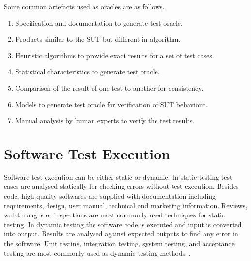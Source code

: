 Some common artefacts used as oracles are as follows.
\begin{enumerate}
\item Specification and documentation to generate test oracle. 
\item Products similar to the SUT but different in algorithm. %
\item Heuristic algorithms to provide exact results for a set of test cases. %
\item Statistical characteristics to generate test oracle. %
\item Comparison of the result of one test to another for consistency. %
\item Models to generate test oracle for verification of SUT behaviour. %
\item Manual analysis by human experts to verify the test results. %
\end{enumerate}

\section{Software Test Execution}
Software test execution can be either static or dynamic. In static testing test cases are analysed statically for checking errors without test execution. Besides code, high quality softwares are supplied with documentation including requirements, design, user manual, technical and marketing information. Reviews, walkthroughs or inspections are most commonly used techniques for static testing. In dynamic testing the software code is executed and input is converted into output. Results are analysed against expected outputs to find any error in the software. Unit testing, integration testing, system testing, and acceptance testing are most commonly used as dynamic testing methods~\cite{fairley1978tutorial}.




